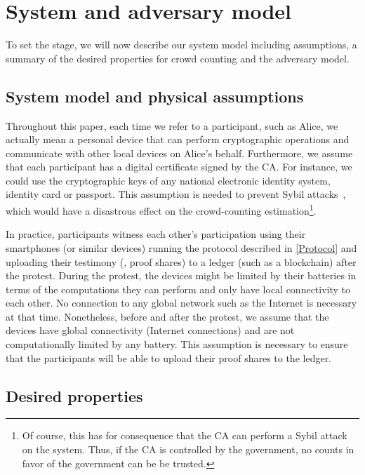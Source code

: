 \section{System and adversary model}%
\label{system-model}

To set the stage, we will now describe our system model including assumptions, a summary of the desired properties for crowd counting and the adversary model.

\subsection{System model and physical assumptions}
\label{assumptions}

Throughout this paper, each time we refer to a participant, such as Alice, we actually mean a personal device that can perform cryptographic operations and communicate with other local devices on Alice's behalf. 
Furthermore, we assume that each participant has a digital certificate signed by the \ac{CA}.
For instance, we could use the cryptographic keys of any national electronic identity system, identity card or passport.
This assumption is needed to prevent Sybil attacks~\cite{SybilAttack}, which would have a disastrous effect on the crowd-counting estimation\footnote{
Of course, this has for consequence that the \ac{CA} can perform a Sybil attack on the system.
Thus, if the \ac{CA} is controlled by the government, no counts in favor of the government can be be trusted.
}.

In practice, participants witness each other's participation using their smartphones (or similar devices) running the protocol described in \cref{Protocol} and uploading their testimony (\ie, proof shares) to a ledger (such as a blockchain) after the protest. 
During the protest, the devices might be limited by their batteries in terms of the computations they can perform and only have local connectivity to each other.
No connection to any global network such as the Internet is necessary at that time.  
Nonetheless, before and after the protest, we assume that the devices have global connectivity (\ie Internet connections) and are not computationally limited by any battery.
This assumption is necessary to ensure that the participants will be able to upload their proof shares to the ledger.

\subsection{Desired properties}

